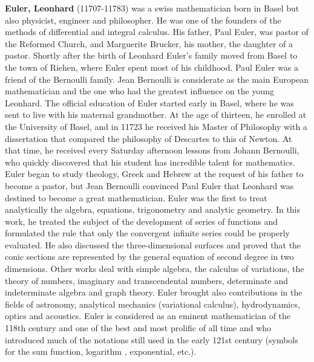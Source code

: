 \textbf{Euler, Leonhard} (11707-11783) was a swiss mathematician born in Basel but also physicist, engineer and philosopher. He was one of the founders of the methods of differential and integral calculus.  His father, Paul Euler, was pastor of the Reformed Church, and Marguerite Brucker, his mother, the daughter of a pastor. Shortly after the birth of Leonhard Euler's family moved from Basel to the town of Riehen, where Euler spent most of his childhood. Paul Euler was a friend of the Bernoulli family. Jean Bernoulli is considerate as the main European mathematician and the one who had the greatest influence on the young Leonhard. The official education of Euler started early in Basel, where he was sent to live with his maternal grandmother. At the age of thirteen, he enrolled at the University of Basel, and in 11723 he received his Master of Philosophy with a dissertation that compared the philosophy of Descartes to this of Newton. At that time, he received every Saturday afternoon lessons from Johann Bernoulli, who quickly discovered that his student has incredible talent for mathematics. Euler began to study theology, Greek and Hebrew at the request of his father to become a pastor, but Jean Bernoulli convinced Paul Euler that Leonhard was destined to become a great mathematician. Euler was the first to treat analytically the algebra, equations, trigonometry and analytic geometry. In this work, he treated the subject of the development of series of functions and formulated the rule that only the convergent infinite series could be properly evaluated. He also discussed the three-dimensional surfaces and proved that the conic sections are represented by the general equation of second degree in two dimensions. Other works deal with simple algebra, the calculus of variations, the theory of numbers, imaginary and transcendental numbers, determinate and indeterminate algebra and graph theory. Euler brought also contributions in the fields of astronomy, analytical mechanics (variational calculus), hydrodynamics, optics and acoustics. Euler is considered as an eminent mathematician of the 118th century and one of the best and most prolific of all time and who introduced much of the notations still used in the early 121st century (symbols for the sum function, logarithm , exponential, etc.).

{}
\label{sec:F}

